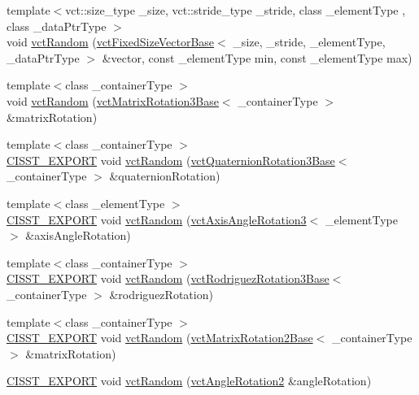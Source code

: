 \begin{DoxyCompactItemize}
\item 
{\footnotesize template$<$vct\+::size\+\_\+type \+\_\+size, vct\+::stride\+\_\+type \+\_\+stride, class \+\_\+element\+Type , class \+\_\+data\+Ptr\+Type $>$ }\\void \hyperlink{group__cisst_vector_gacf79833a14d54008ddbf8ca2216ce336}{vct\+Random} (\hyperlink{classvct_fixed_size_vector_base}{vct\+Fixed\+Size\+Vector\+Base}$<$ \+\_\+size, \+\_\+stride, \+\_\+element\+Type, \+\_\+data\+Ptr\+Type $>$ \&vector, const \+\_\+element\+Type min, const \+\_\+element\+Type max)
\end{DoxyCompactItemize}
\begin{DoxyCompactItemize}
\item 
{\footnotesize template$<$class \+\_\+container\+Type $>$ }\\void \hyperlink{group__cisst_vector_ga4021a127a6f49c8583fd1c1028dd4b8c}{vct\+Random} (\hyperlink{classvct_matrix_rotation3_base}{vct\+Matrix\+Rotation3\+Base}$<$ \+\_\+container\+Type $>$ \&matrix\+Rotation)
\item 
{\footnotesize template$<$class \+\_\+container\+Type $>$ }\\\hyperlink{cmn_export_macros_8h_a99393e0c3ac434b2605235bbe20684f8}{C\+I\+S\+S\+T\+\_\+\+E\+X\+P\+O\+R\+T} void \hyperlink{group__cisst_vector_ga12395d3b16d012b595416c41a0c4fb38}{vct\+Random} (\hyperlink{classvct_quaternion_rotation3_base}{vct\+Quaternion\+Rotation3\+Base}$<$ \+\_\+container\+Type $>$ \&quaternion\+Rotation)
\item 
{\footnotesize template$<$class \+\_\+element\+Type $>$ }\\\hyperlink{cmn_export_macros_8h_a99393e0c3ac434b2605235bbe20684f8}{C\+I\+S\+S\+T\+\_\+\+E\+X\+P\+O\+R\+T} void \hyperlink{group__cisst_vector_ga59df319896c95e38dfe204a761d89ccf}{vct\+Random} (\hyperlink{classvct_axis_angle_rotation3}{vct\+Axis\+Angle\+Rotation3}$<$ \+\_\+element\+Type $>$ \&axis\+Angle\+Rotation)
\item 
{\footnotesize template$<$class \+\_\+container\+Type $>$ }\\\hyperlink{cmn_export_macros_8h_a99393e0c3ac434b2605235bbe20684f8}{C\+I\+S\+S\+T\+\_\+\+E\+X\+P\+O\+R\+T} void \hyperlink{group__cisst_vector_gaab1f9f4cfbae501b968952c23fdbf2af}{vct\+Random} (\hyperlink{classvct_rodriguez_rotation3_base}{vct\+Rodriguez\+Rotation3\+Base}$<$ \+\_\+container\+Type $>$ \&rodriguez\+Rotation)
\item 
{\footnotesize template$<$class \+\_\+container\+Type $>$ }\\\hyperlink{cmn_export_macros_8h_a99393e0c3ac434b2605235bbe20684f8}{C\+I\+S\+S\+T\+\_\+\+E\+X\+P\+O\+R\+T} void \hyperlink{group__cisst_vector_gac57d2ebdaa710b4b9400bd7cfd3b87a2}{vct\+Random} (\hyperlink{classvct_matrix_rotation2_base}{vct\+Matrix\+Rotation2\+Base}$<$ \+\_\+container\+Type $>$ \&matrix\+Rotation)
\item 
\hyperlink{cmn_export_macros_8h_a99393e0c3ac434b2605235bbe20684f8}{C\+I\+S\+S\+T\+\_\+\+E\+X\+P\+O\+R\+T} void \hyperlink{group__cisst_vector_ga515b69d58d116cfb3465c9bb6b9e05dc}{vct\+Random} (\hyperlink{classvct_angle_rotation2}{vct\+Angle\+Rotation2} \&angle\+Rotation)
\end{DoxyCompactItemize}


